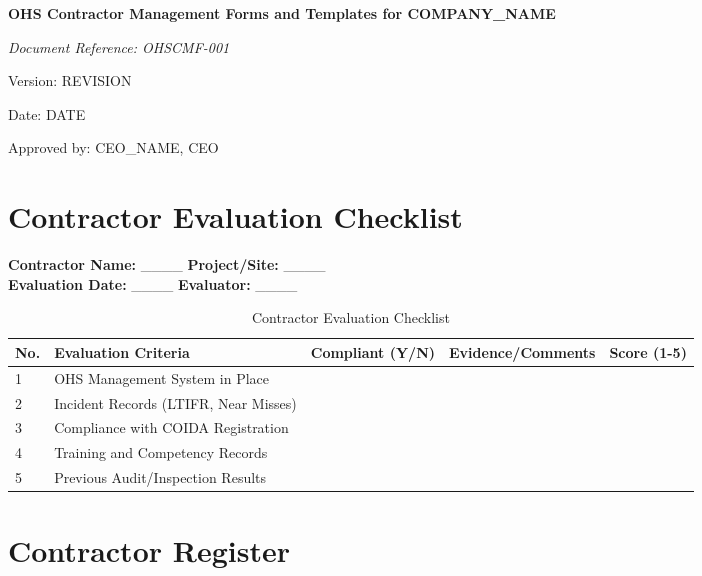 \documentclass[12pt]{article}
\begin{document}
\begin{titlepage}
    \centering
    \vspace*{2cm}
    {\LARGE\bfseries OHS Contractor Management Forms and Templates for {{COMPANY_NAME}}\par}
    \vspace{1cm}
    {\large\itshape Document Reference: OHSCMF-001\par}
    \vspace{0.5cm}
    {\normalsize Version: {{REVISION}}\par}
    \vspace{0.5cm}
    {\normalsize Date: {{DATE}}\par}
    \vspace{2cm}
    {\normalsize Approved by: {{CEO_NAME}}, CEO\par}
\end{titlepage}

\section{Contractor Evaluation Checklist}

\textbf{Contractor Name:} \_\_\_\_ \textbf{Project/Site:} \_\_\_\_\\
\textbf{Evaluation Date:} \_\_\_\_ \textbf{Evaluator:} \_\_\_\_

\begin{table}[h]
    \centering
    \begin{tabular}{p{1cm}p{5cm}p{2cm}p{3cm}p{2cm}}
        \toprule
        \textbf{No.} & \textbf{Evaluation Criteria} & \textbf{Compliant (Y/N)} & \textbf{Evidence/Comments} & \textbf{Score (1-5)} \\
        \midrule
        1 & OHS Management System in Place & & & \\
        2 & Incident Records (LTIFR, Near Misses) & & & \\
        3 & Compliance with COIDA Registration & & & \\
        4 & Training and Competency Records & & & \\
        5 & Previous Audit/Inspection Results & & & \\
        \bottomrule
    \end{tabular}
    \caption{Contractor Evaluation Checklist}
\end{table}

\section{Contractor Register}
\end{document}
